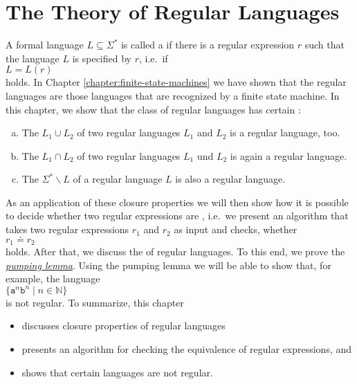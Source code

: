 \chapter{The Theory of Regular Languages \label{chapter:regular-languages}}
A formal language $L \subseteq \Sigma^*$ is called a  
if there is a regular expression $r$ such that the language $L$ is specified by $r$, i.e.~if
\\[0.2cm]
\hspace*{1.3cm}
$L = L(r)$ 
\\[0.2cm]
holds.  In Chapter \ref{chapter:finite-state-machines} we have shown that the regular languages
are those languages that are recognized by a finite state machine.  In this chapter, we show
that the class of regular languages has certain :
\begin{enumerate}[(a)]
\item The  $L_1 \cup L_2$ of two regular languages $L_1$ and $L_2$ is a regular language, too.
\item The  $L_1 \cap L_2$ of two regular languages $L_1$ und $L_2$ is again a regular language.
\item The   $\Sigma^* \backslash L$ of a regular language $L$
      is also a regular language.
\end{enumerate}
As an application of these closure properties we will then show how it is possible to decide whether two
regular expressions are , i.e.~we present an algorithm that takes two regular expressions
$r_1$ and $r_2$ as input and checks, whether 
\\[0.2cm]
\hspace*{1.3cm}
$r_1 \doteq r_2$
\\[0.2cm]
holds.  After that, we discuss the  of regular languages.  To this end, we prove the
\href{http://en.wikipedia.org/wiki/Pumping_lemma_for_regular_languages}{\emph{pumping lemma}}.
Using the pumping lemma we will be able to show that, for example, the language
\\[0.2cm]
\hspace*{1.3cm} $\{ \mathtt{a}^n \mathtt{b}^n \mid n \in \mathbb{N} \}$
\\[0.2cm]
is not regular.  To summarize, this chapter 
\begin{itemize}
\item discusses closure properties of regular languages
\item presents an algorithm for checking the equivalence of regular expressions, and
\item shows that certain languages are not regular.
\end{itemize}


